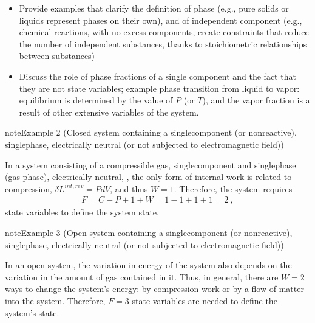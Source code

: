 \documentclass[letterpaper,10pt,english]{jupyterBook}
\begin{document}
\sphinxAtStartPar
{}
\begin{itemize}
\item {} 
\sphinxAtStartPar
Provide examples that clarify the definition of phase (e.g., pure solids or liquids represent phases on their own), and of independent component (e.g., chemical reactions, with no excess components, create constraints that reduce the number of independent substances, thanks to stoichiometric relationships between substances)

\item {} 
\sphinxAtStartPar
Discuss the role of phase fractions of a single component and the fact that they are not state variables; example phase transition from liquid to vapor: equilibrium is determined by the value of \(P\) (or \(T\)), and the vapor fraction is a result of other extensive variables of the system.

\end{itemize}
\label{ch/principles-gibbs-phase-rule:example-5}
\begin{sphinxadmonition}{note}{Example 2 (Closed system containing a single\sphinxhyphen{}component (or non\sphinxhyphen{}reactive), single\sphinxhyphen{}phase, electrically neutral (or not subjected to electromagnetic field))}



\sphinxAtStartPar
In a system consisting of a compressible gas, single\sphinxhyphen{}component and single\sphinxhyphen{}phase (gas phase), electrically neutral,  , the only form of internal work is related to compression, \(\delta L^{int,rev} = P dV\), and thus \(W = 1\). Therefore, the system requires
\begin{equation*}
\begin{split}F = C - P + 1 + W = 1 - 1 + 1 + 1 = 2 \ ,\end{split}
\end{equation*}
\sphinxAtStartPar
state variables to define the system state.
\end{sphinxadmonition}
\label{ch/principles-gibbs-phase-rule:example-6}
\begin{sphinxadmonition}{note}{Example 3 (Open system containing a single\sphinxhyphen{}component (or non\sphinxhyphen{}reactive), single\sphinxhyphen{}phase, electrically neutral (or not subjected to electromagnetic field))}



\sphinxAtStartPar
In an open system, the variation in energy of the system also depends on the variation in the amount of gas contained in it. Thus, in general, there are \(W = 2\) ways to change the system’s energy: by compression work or by a flow of matter into the system. Therefore, \(F=3\) state variables are needed to define the system’s state.
\end{sphinxadmonition}
\end{document}

